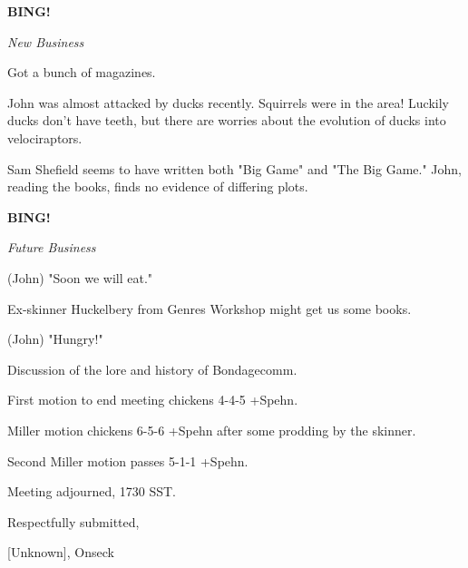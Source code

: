 \documentclass[12pt]{article}
\newcommand{\bing}{{\bf BING!} }
\newcommand{\goto}[1]{\bing \vskip 12pt \centerline{{\em{#1}}}}
\begin{document}
\goto{New Business}

Got a bunch of magazines.

John was almost attacked by ducks recently. Squirrels were in the area! Luckily ducks don't have teeth, but there are worries about the evolution of ducks into velociraptors.

Sam Shefield seems to have written both "Big Game" and "The Big Game." John, reading the books, finds no evidence of differing plots.

\goto{Future Business}

(John) "Soon we will eat."

Ex-skinner Huckelbery from Genres Workshop might get us some books.

(John) "Hungry!"

Discussion of the lore and history of Bondagecomm.

First motion to end meeting chickens 4-4-5 +Spehn.

Miller motion chickens 6-5-6 +Spehn after some prodding by the skinner.

Second Miller motion passes 5-1-1 +Spehn.

\vspace{12pt}

\noindent
Meeting adjourned, 1730 SST.

\vspace{18pt}

\centerline{Respectfully submitted,}
\centerline{[Unknown], Onseck}
\end{document}
